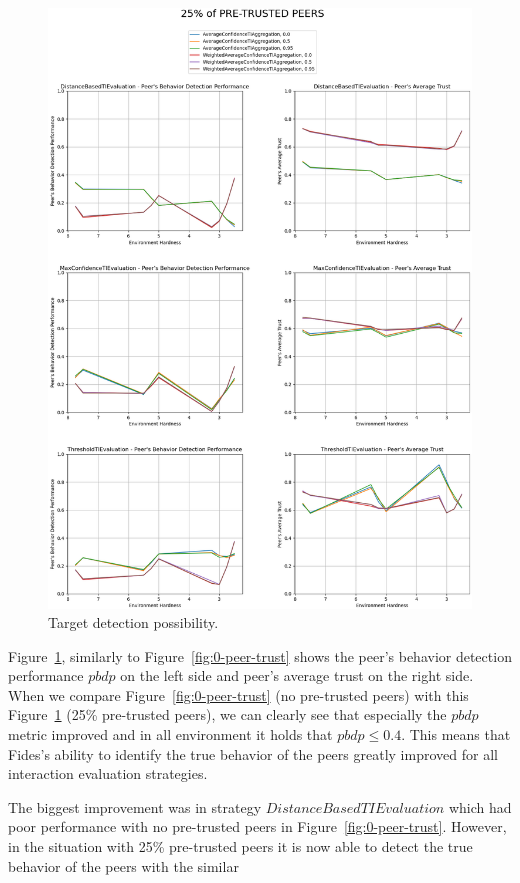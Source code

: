 \begin{figure}[hp]
    \centering
    \includegraphics[width=1.0\textwidth]{assets/25_peer_trust.png}
    \caption{Target detection possibility.}
    \label{fig:25-peer-trust}
\end{figure}

Figure~\ref{fig:25-peer-trust}, similarly to Figure~\ref{fig:0-peer-trust} shows the peer's behavior detection performance $pbdp$ on the left side and peer's average trust on the right side.
When we compare Figure~\ref{fig:0-peer-trust} (no pre-trusted peers) with this Figure~\ref{fig:25-peer-trust} (25\% pre-trusted peers), we can clearly see that especially the $pbdp$ metric improved and in all environment it holds that $pbdp \leq 0.4$. 
This means that Fides's ability to identify the true behavior of the peers greatly improved for all interaction evaluation strategies.

The biggest improvement was in strategy $DistanceBasedTIEvaluation$ which had poor performance with no pre-trusted peers in Figure~\ref{fig:0-peer-trust}. However, in the situation with 25\% pre-trusted peers it is now able to detect the true behavior of the peers with the similar 